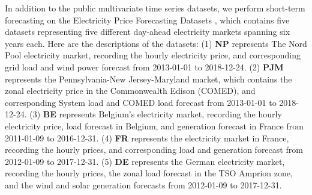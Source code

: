 \documentclass[nohyperref]{article}
\theoremstyle{plain}
\theoremstyle{definition}
\theoremstyle{remark}
\begin{document}
In addition to the public multivariate time series datasets, we perform short-term forecasting on the Electricity Price Forecasting Datasets \cite{lago2021forecasting}, which contains five datasets representing five different day-ahead electricity markets spanning six years each. Here are the descriptions of the datasets: (1) \textbf{NP} represents The Nord Pool electricity market, recording the hourly electricity price, and corresponding grid load and wind power forecast from 2013-01-01 to 2018-12-24. (2) \textbf{PJM} represents the Pennsylvania-New Jersey-Maryland market, which contains the zonal electricity price in the Commonwealth Edison (COMED), and corresponding System load and COMED load forecast from 2013-01-01 to 2018-12-24. (3) \textbf{BE} represents Belgium's electricity market, recording the hourly electricity price, load forecast in Belgium, and generation forecast in France from 2011-01-09 to 2016-12-31. (4) \textbf{FR} represents the electricity market in France, recording the hourly prices, and corresponding load and generation forecast from 2012-01-09 to 2017-12-31. (5) \textbf{DE} represents the German electricity market, recording the hourly prices, the zonal load forecast in the TSO Amprion zone, and the wind and solar generation forecasts from 2012-01-09 to 2017-12-31.
\end{document}
